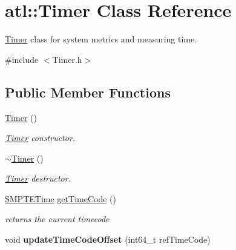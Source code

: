 \hypertarget{classatl_1_1Timer}{}\section{atl\+:\+:Timer Class Reference}
\label{classatl_1_1Timer}


\hyperlink{classatl_1_1Timer}{Timer} class for system metrics and measuring time.  




{\ttfamily \#include $<$Timer.\+h$>$}

\subsection*{Public Member Functions}
\begin{DoxyCompactItemize}
\item 
\hyperlink{classatl_1_1Timer_af007bd0524eedd87d501373b8bd64780}{Timer} ()\hypertarget{classatl_1_1Timer_af007bd0524eedd87d501373b8bd64780}{}\label{classatl_1_1Timer_af007bd0524eedd87d501373b8bd64780}

\begin{DoxyCompactList}\small\item\em \hyperlink{classatl_1_1Timer}{Timer} constructor. \end{DoxyCompactList}\item 
\hyperlink{classatl_1_1Timer_a11e0b243a2f4bf22bd8896cee4d2d0de}{$\sim$\+Timer} ()\hypertarget{classatl_1_1Timer_a11e0b243a2f4bf22bd8896cee4d2d0de}{}\label{classatl_1_1Timer_a11e0b243a2f4bf22bd8896cee4d2d0de}

\begin{DoxyCompactList}\small\item\em \hyperlink{classatl_1_1Timer}{Timer} destructor. \end{DoxyCompactList}\item 
\hyperlink{structatl_1_1SMPTETime}{S\+M\+P\+T\+E\+Time} \hyperlink{classatl_1_1Timer_a8dd84dbb50a5856ab7d2c06cb5f95295}{get\+Time\+Code} ()
\begin{DoxyCompactList}\small\item\em returns the current timecode \end{DoxyCompactList}\item 
void {\bfseries update\+Time\+Code\+Offset} (int64\+\_\+t ref\+Time\+Code)\hypertarget{classatl_1_1Timer_aad12d43dcc641e18735be3767a22c586}{}\label{classatl_1_1Timer_aad12d43dcc641e18735be3767a22c586}


\end{DoxyCompactItemize}
